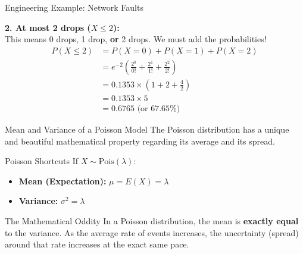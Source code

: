 \begin{frame}[allowframebreaks]{Engineering Example: Network Faults}
    \framebreak
    
    \begin{solutioncont}
        \textbf{2. At most 2 drops ($X \leq 2$):}
        \vspace{0.1cm} \\
        This means 0 drops, 1 drop, \textbf{or} 2 drops. We must add the probabilities!
        \begin{align*}
            P(X \leq 2) &= P(X=0) + P(X=1) + P(X=2) \\
                        &= e^{-2} \left( \frac{2^0}{0!} + \frac{2^1}{1!} + \frac{2^2}{2!} \right) \\
                        &= 0.1353 \times \left( 1 + 2 + \frac{4}{2} \right) \\
                        &= 0.1353 \times 5 \\
                        &= \mathbf{0.6765} \text{ (or 67.65\%)}
        \end{align*}
    \end{solutioncont}
\end{frame}

\begin{frame}{Mean and Variance of a Poisson Model}
    The Poisson distribution has a unique and beautiful mathematical property regarding its average and its spread.

    \vspace{0.3cm}
    \begin{block}{Poisson Shortcuts}
        If $X \sim \text{Pois}(\lambda)$:
        \begin{itemize}
            \item \textbf{Mean (Expectation):} $\mu = E(X) = \lambda$
            \item \textbf{Variance:} $\sigma^2 = \lambda$
        \end{itemize}
    \end{block}

    \pause \vspace{0.3cm}
    \begin{alertblock}{The Mathematical Oddity}
        In a Poisson distribution, the mean is \textbf{exactly equal} to the variance. As the average rate of events increases, the uncertainty (spread) around that rate increases at the exact same pace.
    \end{alertblock}
\end{frame}





